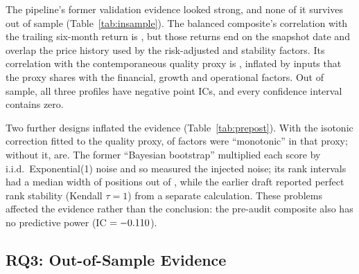 The pipeline's former validation evidence looked strong, and none of it
survives out of sample (Table~\ref{tab:insample}). The balanced composite's
correlation with the trailing six-month return is \InSampleICBalSixM, but
those returns end on the snapshot date and overlap the price history used by
the risk-adjusted and stability factors. Its correlation with the
contemporaneous quality proxy is \InSampleICBalQuality, inflated by inputs
that the proxy shares with the financial, growth and operational factors.
Out of sample, all three profiles have negative point ICs, and every
confidence interval contains zero.

Two further designs inflated the evidence (Table~\ref{tab:prepost}). With
the isotonic correction fitted to the quality proxy, \MonoPre of \MonoTotal
factors were ``monotonic'' in that proxy; without it, \MonoPost are. The
former ``Bayesian bootstrap'' multiplied each score by i.i.d.\
Exponential(1) noise and so measured the injected noise; its rank intervals
had a median width of \PreCIWidthMedian positions out of \PreNFirmsBoot,
while the earlier draft reported perfect rank stability (Kendall $\tau=1$)
from a separate calculation. These problems affected the evidence rather
than the conclusion: the pre-audit composite also has no predictive power
(IC $=-0.110$).

\begin{table}[t]
\centering
\caption{In-sample ``validation'' versus out-of-sample outcome. In-sample
columns are rank correlations of the composite with trailing six-month returns
and with a contemporaneous quality proxy on the snapshot cross-section.
Out-of-sample intervals as in Table~\ref{tab:oos_ic}.}
\label{tab:insample}
\scriptsize
\setlength{\tabcolsep}{3pt}
\resizebox{\columnwidth}{!}{}
\end{table}

\begin{table}[t]
\centering
\caption{Diagnostics before and after the audit corrections of
Section~\ref{sec:audit}. Pre-audit rank intervals come from the former
``Bayesian bootstrap''; post-audit intervals from Section~\ref{sec:rank_design}.}
\label{tab:prepost}
\scriptsize

\end{table}

\subsection{RQ3: Out-of-Sample Evidence}
\label{sec:res_oos}

